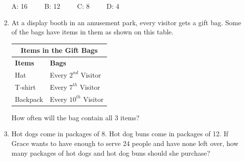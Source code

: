 \documentclass[a4paper,12pt]{article}
\begin{document}
\begin{tcolorbox}[colback=red!0!white, colframe=gray ,title=\subsection{Set Three}\label{SetThree}]
\begin{enumerate}
\begin{multicols}{2}
			A: 16~~~~~B: 12~~~~~C: 8~~~~~D: 4
	\end{multicols}
	\item At a display booth in an amusement park, every visitor gets a gift bag. Some of the bags have items in them as shown on this table.
\begin{center}
	\begin{tabular}{|l|l|}\hline
		\multicolumn{2}{|c|}{Items in the Gift Bags}\\\hline
		\textbf{Items}&\textbf{Bags}\\\hline
		Hat&Every $2^{nd}$ Visitor\\\hline
		T-shirt&Every $7^{th}$ Visitor\\\hline
		Backpack&Every $10^{th}$ Visitor\\\hline
	\end{tabular}
\end{center}
How often will the bag contain all 3 items?

\item Hot dogs come in packages of 8. Hot dog buns come in packages of 12. If Grace wants to have enough to serve 24 people and have none left over, how many packages of hot dogs and hot dog buns should she purchase? 
\end{enumerate}
\end{tcolorbox}\vspace{0.75cm}
\end{document}
